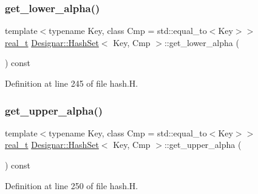 \subsubsection{\texorpdfstring{get\+\_\+lower\+\_\+alpha()}{get\_lower\_alpha()}}
{\footnotesize\ttfamily template$<$typename Key, class Cmp = std\+::equal\+\_\+to$<$\+Key$>$$>$ \\
\hyperlink{namespace_designar_aca2c32af26808dbec1f3a3071fad25ce}{real\+\_\+t} \hyperlink{class_designar_1_1_hash_set}{Designar\+::\+Hash\+Set}$<$ Key, Cmp $>$\+::get\+\_\+lower\+\_\+alpha (\begin{DoxyParamCaption}{ }\end{DoxyParamCaption}) const\hspace{0.3cm}{\ttfamily [inline]}}



Definition at line 245 of file hash.\+H.

\mbox{\label{class_designar_1_1_hash_set_a6719373d3cf21f31d53de969bd81799f}} 
\subsubsection{\texorpdfstring{get\+\_\+upper\+\_\+alpha()}{get\_upper\_alpha()}}
{\footnotesize\ttfamily template$<$typename Key, class Cmp = std\+::equal\+\_\+to$<$\+Key$>$$>$ \\
\hyperlink{namespace_designar_aca2c32af26808dbec1f3a3071fad25ce}{real\+\_\+t} \hyperlink{class_designar_1_1_hash_set}{Designar\+::\+Hash\+Set}$<$ Key, Cmp $>$\+::get\+\_\+upper\+\_\+alpha (\begin{DoxyParamCaption}{ }\end{DoxyParamCaption}) const\hspace{0.3cm}{\ttfamily [inline]}}



Definition at line 250 of file hash.\+H.

\mbox{\label{class_designar_1_1_hash_set_af4014286f5665c9e1c149bd2f4225535}} 
